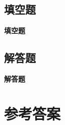   \subsection{填空题}
  \begin{exercise}{\bf 填空题}
  \end{exercise}
  \subsection{解答题}
  \begin{exercise}{\bf 解答题}
  \end{exercise}
\stopexercise
\section{参考答案}
  \begin{multicols}{2}
    \printanswer
  \end{multicols}
